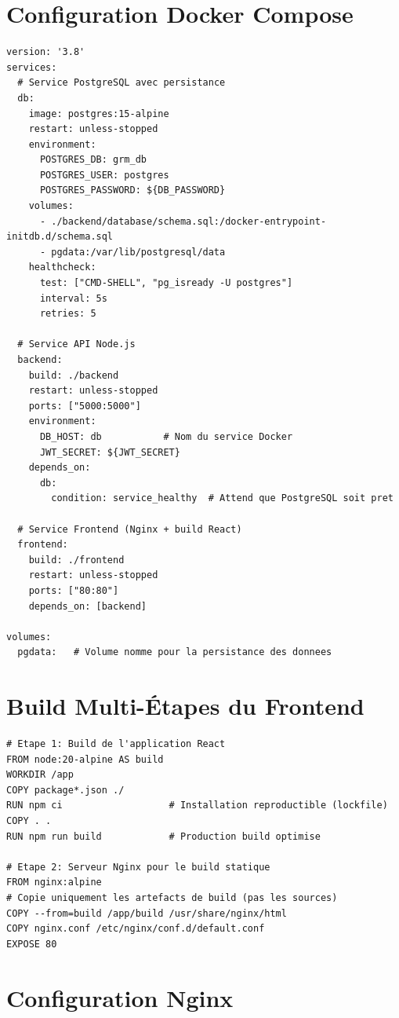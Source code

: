 \documentclass[12pt,a4paper]{report}
\begin{document}
\section{Configuration Docker Compose}

\begin{lstlisting}[style=bash, caption={docker-compose.yml — Configuration complète}]
version: '3.8'
services:
  # Service PostgreSQL avec persistance
  db:
    image: postgres:15-alpine
    restart: unless-stopped
    environment:
      POSTGRES_DB: grm_db
      POSTGRES_USER: postgres
      POSTGRES_PASSWORD: ${DB_PASSWORD}
    volumes:
      - ./backend/database/schema.sql:/docker-entrypoint-initdb.d/schema.sql
      - pgdata:/var/lib/postgresql/data
    healthcheck:
      test: ["CMD-SHELL", "pg_isready -U postgres"]
      interval: 5s
      retries: 5

  # Service API Node.js
  backend:
    build: ./backend
    restart: unless-stopped
    ports: ["5000:5000"]
    environment:
      DB_HOST: db           # Nom du service Docker
      JWT_SECRET: ${JWT_SECRET}
    depends_on:
      db:
        condition: service_healthy  # Attend que PostgreSQL soit pret

  # Service Frontend (Nginx + build React)
  frontend:
    build: ./frontend
    restart: unless-stopped
    ports: ["80:80"]
    depends_on: [backend]

volumes:
  pgdata:   # Volume nomme pour la persistance des donnees
\end{lstlisting}

\section{Build Multi-Étapes du Frontend}

\begin{lstlisting}[style=bash, caption={frontend/Dockerfile — Build multi-étapes}]
# Etape 1: Build de l'application React
FROM node:20-alpine AS build
WORKDIR /app
COPY package*.json ./
RUN npm ci                   # Installation reproductible (lockfile)
COPY . .
RUN npm run build            # Production build optimise

# Etape 2: Serveur Nginx pour le build statique
FROM nginx:alpine
# Copie uniquement les artefacts de build (pas les sources)
COPY --from=build /app/build /usr/share/nginx/html
COPY nginx.conf /etc/nginx/conf.d/default.conf
EXPOSE 80
\end{lstlisting}

\section{Configuration Nginx}
\end{document}
